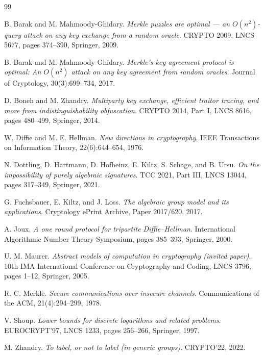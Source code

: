 \documentclass{conjura-conjecture}
\begin{document}
\begin{conjurabibliography}{99}

B. Barak and M. Mahmoody-Ghidary.
\emph{Merkle puzzles are optimal --- an $O(n^{2})$-query attack on any
key exchange from a random oracle}.
CRYPTO 2009, LNCS 5677, pages 374--390, Springer, 2009.

B. Barak and M. Mahmoody-Ghidary.
\emph{Merkle's key agreement protocol is optimal: An $O(n^{2})$ attack
on any key agreement from random oracles}.
Journal of Cryptology, 30(3):699--734, 2017.

D. Boneh and M. Zhandry.
\emph{Multiparty key exchange, efficient traitor tracing, and more from
indistinguishability obfuscation}.
CRYPTO 2014, Part I, LNCS 8616, pages 480--499, Springer, 2014.

W. Diffie and M. E. Hellman.
\emph{New directions in cryptography}.
IEEE Transactions on Information Theory, 22(6):644--654, 1976.

N. Dottling, D. Hartmann, D. Hofheinz, E. Kiltz, S. Schage, and B. Ursu.
\emph{On the impossibility of purely algebraic signatures}.
TCC 2021, Part III, LNCS 13044, pages 317--349, Springer, 2021.

G. Fuchsbauer, E. Kiltz, and J. Loss.
\emph{The algebraic group model and its applications}.
Cryptology ePrint Archive, Paper 2017/620, 2017.

A. Joux.
\emph{A one round protocol for tripartite Diffie--Hellman}.
International Algorithmic Number Theory Symposium, pages 385--393,
Springer, 2000.

U. M. Maurer.
\emph{Abstract models of computation in cryptography (invited paper)}.
10th IMA International Conference on Cryptography and Coding, LNCS 3796,
pages 1--12, Springer, 2005.

R. C. Merkle.
\emph{Secure communications over insecure channels}.
Communications of the ACM, 21(4):294--299, 1978.

V. Shoup.
\emph{Lower bounds for discrete logarithms and related problems}.
EUROCRYPT'97, LNCS 1233, pages 256--266, Springer, 1997.

M. Zhandry.
\emph{To label, or not to label (in generic groups)}.
CRYPTO'22, 2022.

\end{conjurabibliography}
\end{document}
